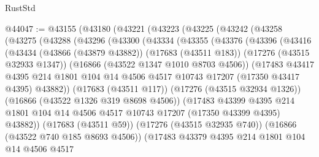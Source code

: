 \begin{lexlean}{RustStd}
\begin{coremodule}
@44047 := @43155
    (@43180
      (@43221
        (@43223
          (@43225
            (@43242
              (@43258
                (@43275
                  (@43288
                    (@43296
                      (@43300
                        (@43334
                          (@43355
                            (@43376
                              (@43396
                                (@43416
                                  (@43434
                                    (@43866 (@43879 @43882))
                                    (@17683 (@43511 @183))
                                    (@17276 (@43515 @32933 @1347))
                                    (@16866 (@43522 @1347 @1010 @8703 @4506))
                                    (@17483
                                      @43417
                                      @4395
                                      @214
                                      @1801
                                      @104
                                      @14
                                      @4506
                                      @4517
                                      @10743
                                      @17207
                                      (@17350 @43417 @4395)
                                      @43882))
                                  (@17683 (@43511 @117))
                                  (@17276 (@43515 @32934 @1326))
                                  (@16866 (@43522 @1326 @319 @8698 @4506))
                                  (@17483
                                    @43399
                                    @4395
                                    @214
                                    @1801
                                    @104
                                    @14
                                    @4506
                                    @4517
                                    @10743
                                    @17207
                                    (@17350 @43399 @4395)
                                    @43882))
                                (@17683 (@43511 @59))
                                (@17276 (@43515 @32935 @740))
                                (@16866 (@43522 @740 @185 @8693 @4506))
                                (@17483
                                  @43379
                                  @4395
                                  @214
                                  @1801
                                  @104
                                  @14
                                  @4506
                                  @4517

\end{coremodule}
\end{lexlean}

